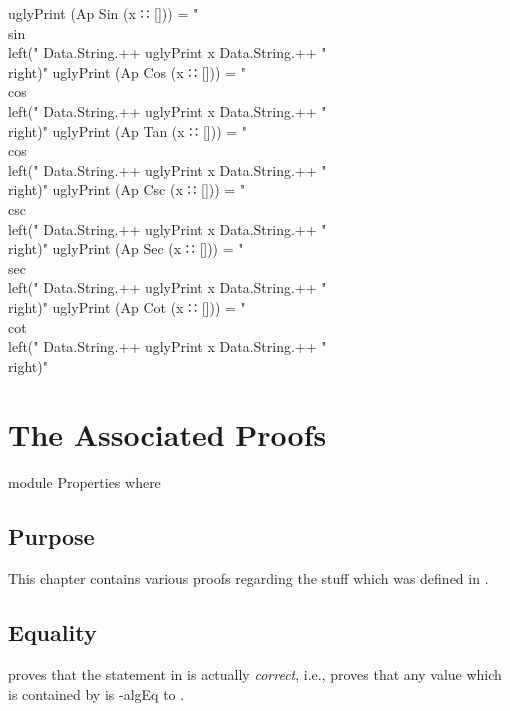 \documentclass{report}
\begin{document}
\begin{code}
  uglyPrint (Ap Sin (x ∷ [])) =
    "\\sin \\left(" Data.String.++ uglyPrint x Data.String.++ "\\right)"
  uglyPrint (Ap Cos (x ∷ [])) =
    "\\cos \\left(" Data.String.++ uglyPrint x Data.String.++ "\\right)"
  uglyPrint (Ap Tan (x ∷ [])) =
    "\\cos \\left(" Data.String.++ uglyPrint x Data.String.++ "\\right)"
  uglyPrint (Ap Csc (x ∷ [])) =
    "\\csc \\left(" Data.String.++ uglyPrint x Data.String.++ "\\right)"
  uglyPrint (Ap Sec (x ∷ [])) =
    "\\sec \\left(" Data.String.++ uglyPrint x Data.String.++ "\\right)"
  uglyPrint (Ap Cot (x ∷ [])) =
    "\\cot \\left(" Data.String.++ uglyPrint x Data.String.++ "\\right)"
\end{code}

\chapter{The Associated Proofs}

\begin{code}
  module Properties where
\end{code}

\section{Purpose}
This chapter contains various proofs regarding the stuff which was defined in .

\section{ Equality}
 proves that the statement in  is actually \emph{correct}, i.e.,  proves that any value which is contained by   is -\gls{algEq} to .
\end{document}
